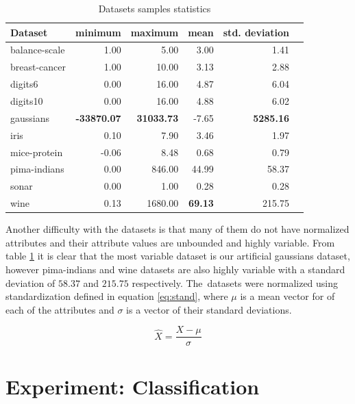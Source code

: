 \documentclass[12pt,a4paper]{report}
\begin{document}
\begin{table}[ht] \centering
\begin{tabular}{lrrrrr}
\hline
Dataset & minimum & maximum & mean & std. deviation \\
\hline
balance-scale           & 1.00  & 5.00    & 3.00  & 1.41 \\
breast-cancer           & 1.00  & 10.00   & 3.13  & 2.88 \\
digits6                 & 0.00  & 16.00   & 4.87  & 6.04 \\
digits10                & 0.00  & 16.00   & 4.88  & 6.02 \\
gaussians               & \textbf{-33870.07} & \textbf{31033.73} & -7.65 & \textbf{5285.16} \\
iris                    & 0.10  & 7.90    & 3.46  & 1.97 \\
mice-protein            & -0.06 & 8.48    & 0.68  & 0.79 \\
pima-indians            & 0.00  & 846.00  & 44.99 & 58.37 \\
sonar                   & 0.00  & 1.00    & 0.28  & 0.28 \\
wine                    & 0.13  & 1680.00 & \textbf{69.13} & 215.75 \\
\hline
\end{tabular}
\caption{Datasets samples statistics} \label{tab:datasets-samples}
\end{table}

Another difficulty with the datasets is that many of them do not have normalized attributes and their attribute values are unbounded and highly variable. From table \ref{tab:datasets-samples} it is clear that the most variable dataset is our artificial gaussians dataset, however pima-indians and wine datasets are also highly variable with a standard deviation of $58.37$ and $215.75$ respectively. The~datasets were normalized using standardization defined in equation \ref{eq:stand}, where $\mu$ is a mean vector for of each of the attributes and $\sigma$ is a vector of their standard deviations.

\begin{equation} \label{eq:stand}
\hat{X} = \frac{X-\mu}{\sigma}
\end{equation}

\section{Experiment: Classification} \label{chap:exp:classification}
\end{document}
